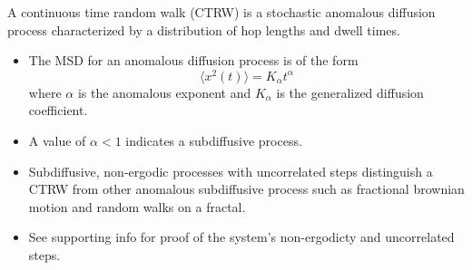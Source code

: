 \documentclass{article}
\begin{document}
  A continuous time random walk (CTRW) is a stochastic anomalous diffusion
  process characterized by a distribution of hop lengths and dwell times.
  \begin{itemize}
	\item The MSD for an anomalous diffusion process is of the form
	\begin{equation} 
	\langle x^2(t) \rangle = K_{\alpha}t^\alpha
	\label{eqn:msd_form}
	\end{equation} 
	where $\alpha$ is the anomalous exponent and $K_\alpha$ is the
	generalized diffusion coefficient. 
	\item A value of $\alpha < 1$ indicates a subdiffusive process.
	\item Subdiffusive, non-ergodic processes with uncorrelated steps distinguish 
	a CTRW from other anomalous subdiffusive process such as fractional brownian motion 
	and random walks on a fractal.~\cite{meroz_toolbox_2015}
	\item See supporting info for proof of the system's non-ergodicty and uncorrelated steps.
  \end{itemize}
\end{document}
